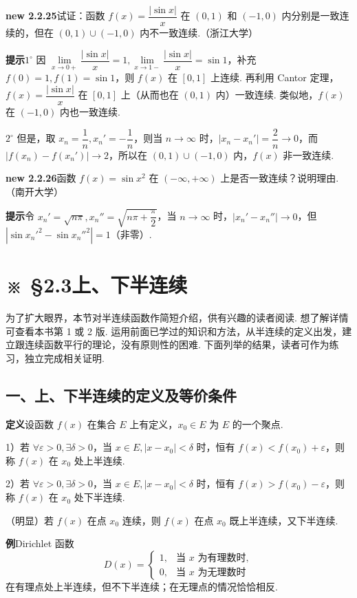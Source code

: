 \documentclass[UTF8,12pt,a4paper,fontset=fandol]{ctexart}
\begin{document}
\noindent\textbf{new 2.2.25}\quad 试证：函数 $f(x)=\dfrac{|\sin x|}{x}$ 在 $(0,1)$ 和 $(-1,0)$ 内分别是一致连续的，但在 $(0,1)\cup(-1,0)$ 内不一致连续.（浙江大学）

\noindent\textbf{提示}\quad $1^\circ$ 因 $\lim\limits_{x\to0+}\dfrac{|\sin x|}{x}=1,\lim\limits_{x\to1-}\dfrac{|\sin x|}{x}=\sin1$，补充 $f(0)=1,f(1)=\sin1$，则 $f(x)$ 在 $[0,1]$ 上连续. 再利用 Cantor 定理，$f(x)=\dfrac{|\sin x|}{x}$ 在 $[0,1]$ 上（从而也在 $(0,1)$ 内）一致连续. 类似地，$f(x)$ 在 $(-1,0)$ 内也一致连续.

$2^\circ$ 但是，取 $x_n=\dfrac1n,x_n'=-\dfrac1n$，则当 $n\to\infty$ 时，$|x_n-x_n'|=\dfrac2n\to0$，而 $|f(x_n)-f(x_n')|\to2$，所以在 $(0,1)\cup(-1,0)$ 内，$f(x)$ 非一致连续.

\noindent\textbf{new 2.2.26}\quad 函数 $f(x)=\sin x^2$ 在 $(-\infty,+\infty)$ 上是否一致连续？说明理由.（南开大学）

\noindent\textbf{提示}\quad 令 $x_n'=\sqrt{n\pi},x_n''=\sqrt{n\pi+\dfrac\pi2}$，当 $n\to\infty$ 时，$|x_n'-x_n''|\to0$，但 $|\sin x_n'^2-\sin x_n''^2|=1$（非零）.

\section*{※ §2.3\quad 上、下半连续}

为了扩大眼界，本节对半连续函数作简短介绍，供有兴趣的读者阅读. 想了解详情可查看本书第 1 或 2 版. 运用前面已学过的知识和方法，从半连续的定义出发，建立跟连续函数平行的理论，没有原则性的困难. 下面列举的结果，读者可作为练习，独立完成相关证明.

\subsection*{一、上、下半连续的定义及等价条件}

\noindent\textbf{定义}\quad 设函数 $f(x)$ 在集合 $E$ 上有定义，$x_0\in E$ 为 $E$ 的一个聚点.

1）若 $\forall\varepsilon>0,\exists\delta>0$，当 $x\in E,|x-x_0|<\delta$ 时，恒有 $f(x)<f(x_0)+\varepsilon$，则称 $f(x)$ 在 $x_0$ 处上半连续.

2）若 $\forall\varepsilon>0,\exists\delta>0$，当 $x\in E,|x-x_0|<\delta$ 时，恒有 $f(x)>f(x_0)-\varepsilon$，则称 $f(x)$ 在 $x_0$ 处下半连续.

（明显）若 $f(x)$ 在点 $x_0$ 连续，则 $f(x)$ 在点 $x_0$ 既上半连续，又下半连续.

\noindent\textbf{例}\quad Dirichlet 函数
\[
  D(x)=
  \begin{cases}
    1, & \text{当 }x\text{ 为有理数时},\\
    0, & \text{当 }x\text{ 为无理数时}
  \end{cases}
\]
在有理点处上半连续，但不下半连续；在无理点的情况恰恰相反.
\end{document}
